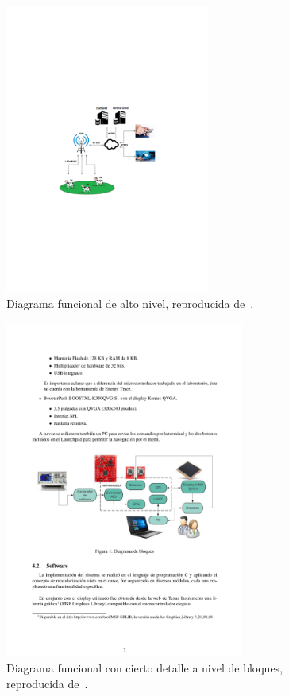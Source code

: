 \documentclass[a4paper,12pt]{article}
\begin{document}
\begin{linenumbers}
\begin{figure}[ht]
  \begin{center}
    \includegraphics[width=0.6\textwidth]{vacas.pdf}
  \end{center}
  \caption{Diagrama funcional de alto nivel, reproducida de~\cite{acosta2020}. }
  \label{fig:vacas}
\end{figure}

\begin{figure}[ht]
  \begin{center}
    \includegraphics[width=0.7\textwidth]{guri.pdf}
  \end{center}
  \caption{Diagrama funcional con cierto detalle a nivel de bloques, reproducida de~\cite{cabrera2019}. }
  \label{fig:guri}
\end{figure}




\end{linenumbers}
\end{document}
